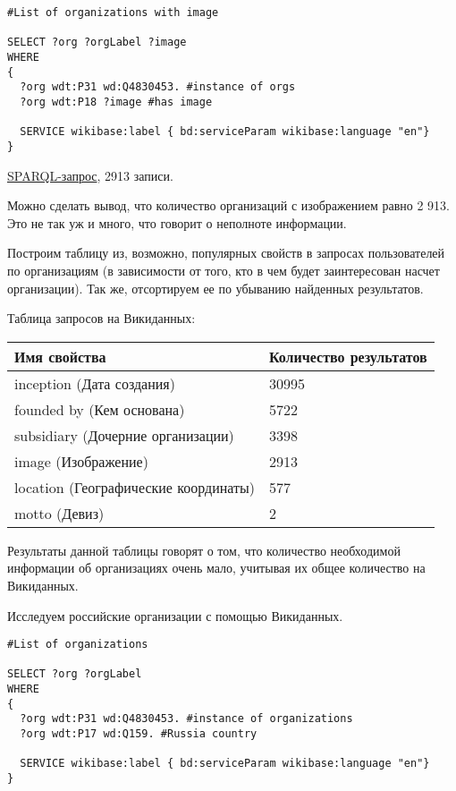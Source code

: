 \begin{lstlisting}[language=SPARQL]
#List of organizations with image

SELECT ?org ?orgLabel ?image
WHERE
{
  ?org wdt:P31 wd:Q4830453. #instance of orgs
  ?org wdt:P18 ?image #has image
  
  SERVICE wikibase:label { bd:serviceParam wikibase:language "en"}
}
\end{lstlisting}

\href{https://query.wikidata.org/#%23List%20of%20organisations%20%0A%0ASELECT%20%3Forg%20%3ForgLabel%20%3Fimage%0AWHERE%0A%7B%0A%20%20%3Forg%20wdt%3AP31%20wd%3AQ4830453.%20%23instance%20of%20orgs%0A%20%20%3Forg%20wdt%3AP18%20%3Fimage%0A%20%20%0A%0A%20%20SERVICE%20wikibase%3Alabel%20%7B%20bd%3AserviceParam%20wikibase%3Alanguage%20%22en%22%7D%0A%7D}{SPARQL-запрос}, 2913 записи.

Можно сделать вывод, что количество организаций с изображением равно 2 913. Это не так уж и много, что говорит о неполноте информации.

Построим таблицу из, возможно, популярных свойств в запросах пользователей по организациям (в зависимости от того, кто в чем будет заинтересован насчет организации). Так же, отсортируем ее по убыванию найденных результатов.

Таблица запросов на Викиданных:\\
\begin{tabular}{|l|l|}
\hline
\textbf{Имя свойства} & \textbf{Количество результатов} \\
\hline
inception (Дата создания) & 30995 \\	
\hline
founded by (Кем основана) & 5722 \\
\hline
subsidiary (Дочерние организации) & 3398 \\
\hline
image (Изображение) & 2913 \\
\hline
location (Географические координаты) & 577 \\
\hline
motto (Девиз) & 2 \\
\hline
\end{tabular}

Результаты данной таблицы говорят о том, что количество необходимой информации об организациях очень мало, учитывая их общее количество на Викиданных. 

Исследуем российские организации с помощью Викиданных.

\begin{lstlisting}[language=SPARQL]
#List of organizations 

SELECT ?org ?orgLabel
WHERE
{
  ?org wdt:P31 wd:Q4830453. #instance of organizations
  ?org wdt:P17 wd:Q159. #Russia country

  SERVICE wikibase:label { bd:serviceParam wikibase:language "en"}
}
\end{lstlisting}

